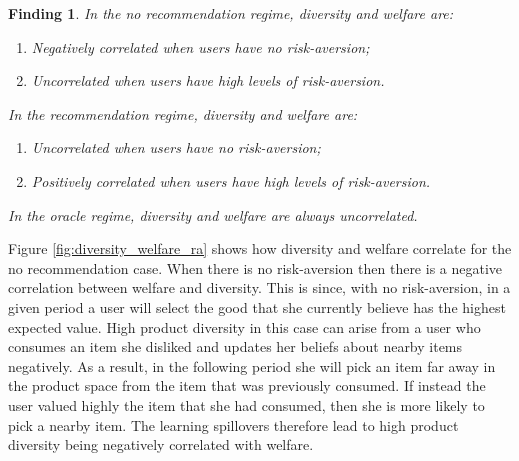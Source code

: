 \documentclass[sigconf]{acmart}
\newtheorem{finding}{Finding}
\begin{document}
\begin{finding}\label{finding_diversity_welfare_corr}
In the no recommendation regime, diversity and welfare are:
\begin{enumerate}
\item Negatively correlated when users have no risk-aversion;
\item Uncorrelated when users have high levels of risk-aversion.
\end{enumerate}
In the recommendation regime, diversity and welfare are:
\begin{enumerate}
\item Uncorrelated when users have no risk-aversion;
\item Positively correlated when users have high levels of risk-aversion.
\end{enumerate}
In the oracle regime, diversity and welfare are always uncorrelated.
\end{finding}

Figure \ref{fig:diversity_welfare_ra} shows how diversity and welfare correlate for the no recommendation case. When there is no risk-aversion then there is a negative correlation between welfare and diversity. This is since, with no risk-aversion, in a given period a user will select the good that she currently believe has the highest expected value. High product diversity in this case can arise from a user who consumes an item she disliked and updates her beliefs about nearby items negatively. As a result, in the following period she will pick an item far away in the product space from the item that was previously consumed. If instead the user valued highly the item that she had consumed, then she is more likely to pick a nearby item. The learning spillovers therefore lead to high product diversity being negatively correlated with welfare.
\par




\end{document}
